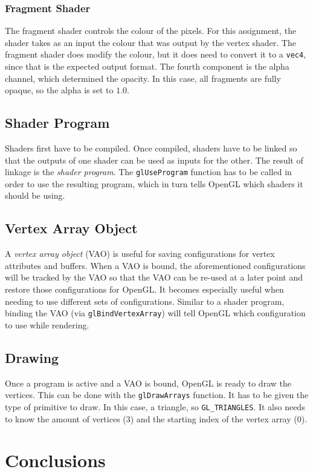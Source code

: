 \documentclass[a4paper, 12pt]{scrartcl}
\begin{document}
\subsubsection{Fragment Shader}
The fragment shader controls the colour of the pixels. For this assignment, the shader takes as an input the colour that was output by the vertex shader. The fragment shader does modify the colour, but it does need to convert it to a \texttt{vec4}, since that is the expected output format. The fourth component is the alpha channel, which determined the opacity. In this case, all fragments are fully opaque, so the alpha is set to $1.0$.

\subsection{Shader Program}
Shaders first have to be compiled. Once compiled, shaders have to be linked so that the outputs of one shader can be used as inputs for the other. The result of linkage is the \textit{shader program}. The \texttt{glUseProgram} function has to be called in order to use the resulting program, which in turn tells OpenGL which shaders it should be using.

\subsection{Vertex Array Object}
A \textit{vertex array object} (VAO) is useful for saving configurations for vertex attributes and buffers. When a VAO is bound, the aforementioned configurations will be tracked by the VAO so that the VAO can be re-used at a later point and restore those configurations for OpenGL. It becomes especially useful when needing to use different sets of configurations. Similar to a shader program, binding the VAO (via \texttt{glBindVertexArray}) will tell OpenGL which configuration to use while rendering.

\subsection{Drawing}
Once a program is active and a VAO is bound, OpenGL is ready to draw the vertices. This can be done with the \texttt{glDrawArrays} function. It has to be given the type of primitive to draw. In this case, a triangle, so \texttt{GL\_TRIANGLES}. It also needs to know the amount of vertices (3) and the starting index of the vertex array (0).

\section{Conclusions}
\end{document}
